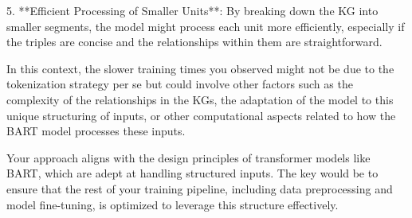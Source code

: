 5. **Efficient Processing of Smaller Units**: By breaking down the KG into smaller segments, the model might process each unit more efficiently, especially if the triples are concise and the relationships within them are straightforward.

In this context, the slower training times you observed might not be due to the tokenization strategy per se but could involve other factors such as the complexity of the relationships in the KGs, the adaptation of the model to this unique structuring of inputs, or other computational aspects related to how the BART model processes these inputs.

Your approach aligns with the design principles of transformer models like BART, which are adept at handling structured inputs. The key would be to ensure that the rest of your training pipeline, including data preprocessing and model fine-tuning, is optimized to leverage this structure effectively.